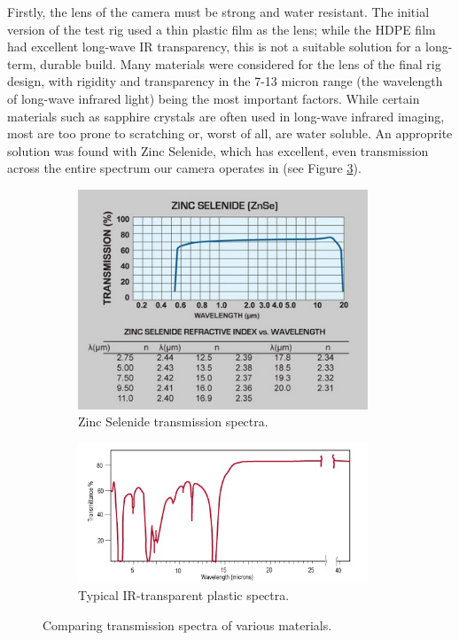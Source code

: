 Firstly, the lens of the camera must be strong and water resistant. The initial version of the test rig used a thin plastic film as the lens; while the HDPE film had excellent long-wave IR transparency, this is not a suitable solution for a long-term, durable build. Many materials were considered for the lens of the final rig design, with rigidity and transparency in the 7-13 micron range (the wavelength of long-wave infrared light) being the most important factors. While certain materials such as sapphire crystals are often used in long-wave infrared imaging, most are too prone to scratching or, worst of all, are water soluble. An approprite solution was found with Zinc Selenide, which has excellent, even transmission across the entire spectrum our camera operates in (see Figure \ref{fig:spectra}).

\begin{figure}
\centering
\begin{subfigure}{0.4\textwidth}
 \centering
 \includegraphics[width=0.95\textwidth]{"./image/zinc_selenide_spectra"}
 \caption{Zinc Selenide transmission spectra.}
 \label{fig:spectra:sub1}
\end{subfigure}
\begin{subfigure}{0.4\textwidth}
 \centering
 \includegraphics[width=0.95\textwidth]{"./image/edmund_plastic_spectra"}
 \caption{Typical IR-transparent plastic spectra.}
 \label{fig:spectra:sub2}
\end{subfigure}
\caption{Comparing transmission spectra of various materials.}
\label{fig:spectra}
\end{figure}

